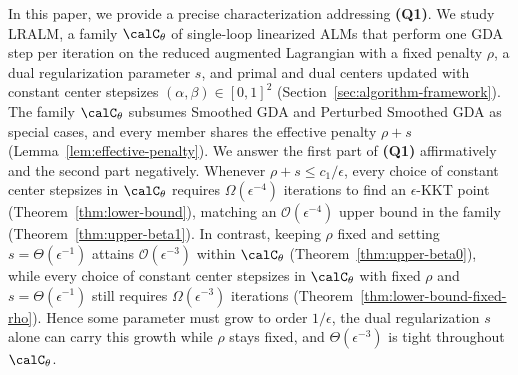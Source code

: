 In this paper, we provide a precise characterization addressing \textbf{(Q1)}.
We study LRALM, a family $\calC_\theta$ of single-loop linearized ALMs that
perform one GDA step per iteration on the reduced augmented Lagrangian with a
fixed penalty $\rho$, a dual regularization parameter $s$, and primal and dual
centers updated with constant center stepsizes $(\alpha,\beta)\in[0,1]^2$
(Section~\ref{sec:algorithm-framework}). The family $\calC_\theta$ subsumes
Smoothed GDA and Perturbed Smoothed GDA as special cases, and every member
shares the effective penalty $\rho+s$ (Lemma~\ref{lem:effective-penalty}). We
answer the first part of \textbf{(Q1)} affirmatively and the second part
negatively. Whenever $\rho+s\le c_1/\epsilon$, every choice of constant center
stepsizes in $\calC_\theta$ requires $\Omega(\epsilon^{-4})$ iterations to find
an $\epsilon$-KKT point (Theorem~\ref{thm:lower-bound}), matching an
$\mathcal O(\epsilon^{-4})$ upper bound in the family
(Theorem~\ref{thm:upper-beta1}). In contrast, keeping $\rho$ fixed and setting
$s=\Theta(\epsilon^{-1})$ attains $\mathcal O(\epsilon^{-3})$ within
$\calC_\theta$ (Theorem~\ref{thm:upper-beta0}), while every choice of constant
center stepsizes in $\calC_\theta$ with fixed $\rho$ and
$s=\Theta(\epsilon^{-1})$ still requires $\Omega(\epsilon^{-3})$ iterations
(Theorem~\ref{thm:lower-bound-fixed-rho}). Hence some parameter must grow to
order $1/\epsilon$, the dual regularization $s$ alone can carry this growth
while $\rho$ stays fixed, and $\Theta(\epsilon^{-3})$ is tight throughout
$\calC_\theta$.

